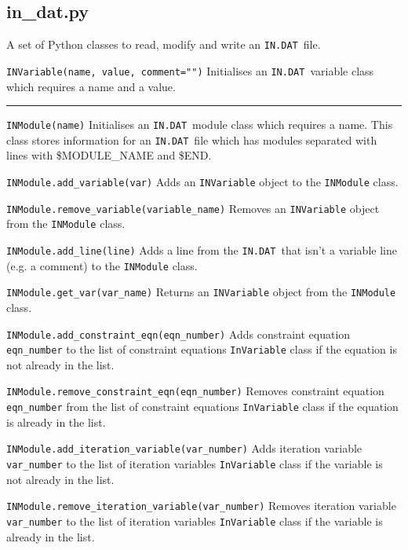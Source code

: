 \documentclass[11pt,a4paper]{report}
\newcommand{\indat}{\mbox{\texttt{IN.DAT}}}
\begin{document}
\subsection{in\_dat.py}

A set of Python classes to read, modify and write an \indat\ file.

\begin{description}

\item{\verb|INVariable(name, value, comment="")| } Initialises an \indat\
  variable class which requires a name and a value.

\end{description}

\rule{\textwidth}{0.4pt}

\begin{description}

\item{\verb|INModule(name)|} Initialises an \indat\ module class which
  requires a name. This class stores information for an \indat\ file which has
  modules separated with lines with \$MODULE\_NAME and \$END.

\item{\verb|INModule.add_variable(var)|} Adds an \verb|INVariable| object to
  the \verb|INModule| class.

\item{\verb|INModule.remove_variable(variable_name)|} Removes an
  \verb|INVariable| object from the \verb|INModule| class.

\item{\verb|INModule.add_line(line)|} Adds a line from the \indat\ that isn't
  a variable line (e.g. a comment) to the \verb|INModule| class.

\item{\verb|INModule.get_var(var_name)|} Returns an \verb|INVariable| object
  from the \verb|INModule| class.

\item{\verb|INModule.add_constraint_eqn(eqn_number)|} Adds constraint
  equation \verb|eqn_number| to the list of constraint equations
  \verb|InVariable| class if the equation is not already in the list.

\item{\verb|INModule.remove_constraint_eqn(eqn_number)|} Removes
  constraint equation \verb|eqn_number| from the list of constraint
  equations \verb|InVariable| class if the equation is already in the list.

\item{\verb|INModule.add_iteration_variable(var_number)|} Adds iteration
  variable \verb|var_number| to the list of iteration variables
  \verb|InVariable| class if the variable is not already in the list.

\item{\verb|INModule.remove_iteration_variable(var_number)|} Removes
  iteration variable \verb|var_number| to the list of iteration variables
  \verb|InVariable| class if the variable is already in the list.

\end{description}
\end{document}
